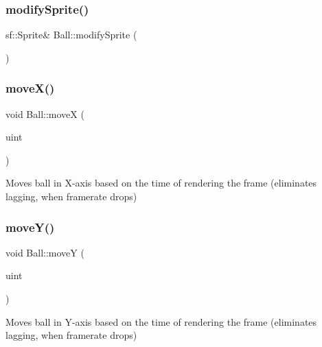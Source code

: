 \mbox{\label{class_ball_a06adff7ba12d0971bb9885cf3fbd2950}} 
\subsubsection{\texorpdfstring{modifySprite()}{modifySprite()}}
{\footnotesize\ttfamily sf\+::\+Sprite\& Ball\+::modify\+Sprite (\begin{DoxyParamCaption}{ }\end{DoxyParamCaption})\hspace{0.3cm}{\ttfamily [inline]}}

\mbox{\label{class_ball_ab2a08ec563b02d1dcb0b38dcd5429967}} 
\subsubsection{\texorpdfstring{moveX()}{moveX()}}
{\footnotesize\ttfamily void Ball\+::moveX (\begin{DoxyParamCaption}\item[{uint}]{ }\end{DoxyParamCaption})}



Moves ball in X-\/axis based on the time of rendering the frame (eliminates lagging, when framerate drops) 

\mbox{\label{class_ball_a5c833ba1588d41ea4176b6fcffff850e}} 
\subsubsection{\texorpdfstring{moveY()}{moveY()}}
{\footnotesize\ttfamily void Ball\+::moveY (\begin{DoxyParamCaption}\item[{uint}]{ }\end{DoxyParamCaption})}



Moves ball in Y-\/axis based on the time of rendering the frame (eliminates lagging, when framerate drops) 

\mbox{\label{class_ball_a57806d70f8a4f78ba7e66d425465e1e4}} 
